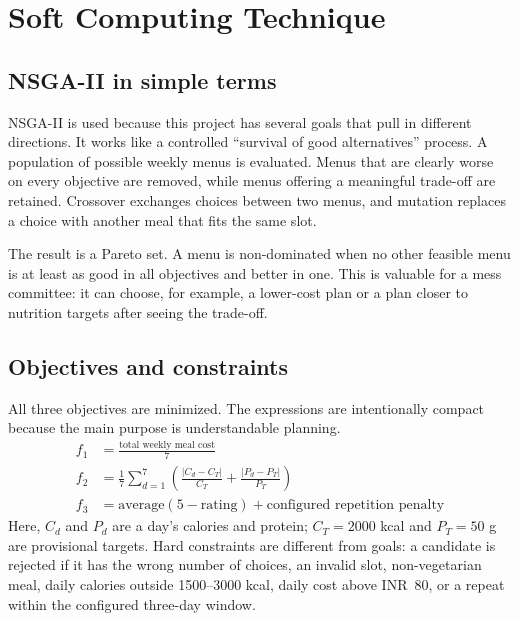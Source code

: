 \documentclass[12pt,a4paper]{report}
\begin{document}
\chapter{Soft Computing Technique}
\section{NSGA-II in simple terms}
NSGA-II is used because this project has several goals that pull in different directions. It works like a controlled ``survival of good alternatives'' process. A population of possible weekly menus is evaluated. Menus that are clearly worse on every objective are removed, while menus offering a meaningful trade-off are retained. Crossover exchanges choices between two menus, and mutation replaces a choice with another meal that fits the same slot.

The result is a Pareto set. A menu is non-dominated when no other feasible menu is at least as good in all objectives and better in one. This is valuable for a mess committee: it can choose, for example, a lower-cost plan or a plan closer to nutrition targets after seeing the trade-off.

\section{Objectives and constraints}
All three objectives are minimized. The expressions are intentionally compact because the main purpose is understandable planning.
\begin{align*}
f_1 &= \frac{\text{total weekly meal cost}}{7} \\[-2pt]
f_2 &= \frac{1}{7}\sum_{d=1}^{7}\left(\frac{|C_d-C_T|}{C_T}+\frac{|P_d-P_T|}{P_T}\right) \\[-2pt]
f_3 &= \text{average}(5-\text{rating}) + \text{configured repetition penalty}
\end{align*}
Here, $C_d$ and $P_d$ are a day's calories and protein; $C_T=2000$ kcal and $P_T=50$ g are provisional targets. Hard constraints are different from goals: a candidate is rejected if it has the wrong number of choices, an invalid slot, non-vegetarian meal, daily calories outside 1500--3000 kcal, daily cost above INR~80, or a repeat within the configured three-day window.
\end{document}
